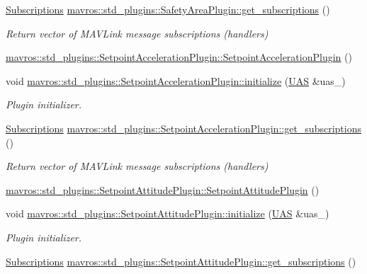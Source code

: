 \begin{DoxyCompactItemize}
\mbox{\hyperlink{group__plugin_ga8967d61fc77040e0c3ea5a4585d62a09}{Subscriptions}} \mbox{\hyperlink{group__plugin_gade85cfda6dd25076ce1a72955806fe45}{mavros\+::std\+\_\+plugins\+::\+Safety\+Area\+Plugin\+::get\+\_\+subscriptions}} ()
\begin{DoxyCompactList}\small\item\em Return vector of M\+A\+V\+Link message subscriptions (handlers) \end{DoxyCompactList}\item 
\mbox{\hyperlink{group__plugin_gadb07b9fc791c21aa306f0f5a92533eef}{mavros\+::std\+\_\+plugins\+::\+Setpoint\+Acceleration\+Plugin\+::\+Setpoint\+Acceleration\+Plugin}} ()
\item 
void \mbox{\hyperlink{group__plugin_gaff69fabd330e14673218e9a83b314ba6}{mavros\+::std\+\_\+plugins\+::\+Setpoint\+Acceleration\+Plugin\+::initialize}} (\mbox{\hyperlink{classmavros_1_1UAS}{U\+AS}} \&uas\+\_\+)
\begin{DoxyCompactList}\small\item\em Plugin initializer. \end{DoxyCompactList}\item 
\mbox{\hyperlink{group__plugin_ga8967d61fc77040e0c3ea5a4585d62a09}{Subscriptions}} \mbox{\hyperlink{group__plugin_ga07ccc1eddfa34ce64d9d61c1255ace1c}{mavros\+::std\+\_\+plugins\+::\+Setpoint\+Acceleration\+Plugin\+::get\+\_\+subscriptions}} ()
\begin{DoxyCompactList}\small\item\em Return vector of M\+A\+V\+Link message subscriptions (handlers) \end{DoxyCompactList}\item 
\mbox{\hyperlink{group__plugin_ga59562b4cfc4d05afd3772b3e4d050098}{mavros\+::std\+\_\+plugins\+::\+Setpoint\+Attitude\+Plugin\+::\+Setpoint\+Attitude\+Plugin}} ()
\item 
void \mbox{\hyperlink{group__plugin_ga99901f90ec1683567962b8d131efe84e}{mavros\+::std\+\_\+plugins\+::\+Setpoint\+Attitude\+Plugin\+::initialize}} (\mbox{\hyperlink{classmavros_1_1UAS}{U\+AS}} \&uas\+\_\+)
\begin{DoxyCompactList}\small\item\em Plugin initializer. \end{DoxyCompactList}\item 
\mbox{\hyperlink{group__plugin_ga8967d61fc77040e0c3ea5a4585d62a09}{Subscriptions}} \mbox{\hyperlink{group__plugin_ga41b8d12774fb380cb28817f5adec25e5}{mavros\+::std\+\_\+plugins\+::\+Setpoint\+Attitude\+Plugin\+::get\+\_\+subscriptions}} ()

\end{DoxyCompactItemize}
